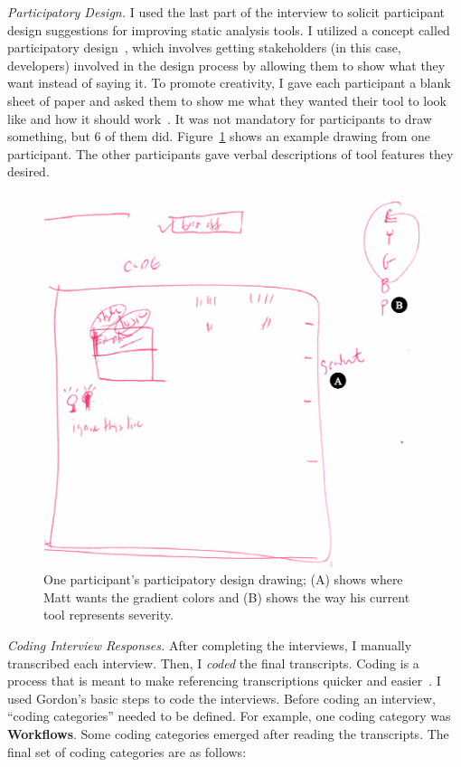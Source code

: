 \documentclass{llncs}
\begin{document}
\vspace{0.5em}
\noindent\textit{Participatory Design.}
I used the last part of the interview to solicit participant design suggestions for improving static analysis tools. I utilized a concept called participatory design~\cite{Spinuzzi:2005:Participatory}, which involves
getting stakeholders (in this case, developers) involved in the design process by allowing them to show what they want instead of saying it. To promote creativity, I gave each participant a blank sheet of paper and asked them to show me what they wanted their tool to look like and how it should work~\cite{Johnson:2012:PreFFSAT}. It was not mandatory for participants to draw something, but 6 of them did. Figure~\ref{fig:drawing} shows an example drawing from one participant. The other participants gave verbal descriptions of tool features they desired.

\begin{figure} [h]
	\centering
	\includegraphics[width=\textwidth]{figs/participatory.pdf}
	\caption{One participant's participatory design drawing; (A) shows where Matt wants the gradient colors and (B) shows the way his current tool represents severity.}
	\label{fig:drawing}
\end{figure}

\vspace{0.5em}
\noindent\textit{Coding Interview Responses.}
After completing the interviews, I manually transcribed each interview. Then, I \textit{coded} the final transcripts. Coding is a process that is meant to make referencing transcriptions quicker and
easier~\cite{Gordon:1998:Coding}. I used Gordon's basic steps to code the interviews. Before coding an interview, ``coding categories'' needed to be defined. For example, one coding category was \textbf{Workflows}. 
Some coding categories emerged after reading the transcripts.
The final set of coding categories are as follows: 
\end{document}
